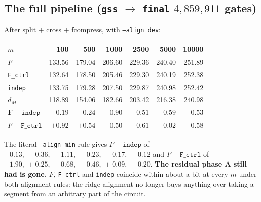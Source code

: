 \documentclass[11pt]{article}
\newcommand{\code}[1]{\texttt{#1}}
\begin{document}
\subsection{The full pipeline (\code{gss} $\to$ \code{final} $4{,}859{,}911$ gates)}
After split $+$ cross $+$ fcompress, with \code{--align dev}:
\begin{center}\small
\begin{tabular}{@{}lrrrrrr@{}}
\toprule
$m$ & 100 & 500 & 1000 & 2500 & 5000 & 10000 \\
\midrule
$F$ & 133.56 & 179.04 & 206.60 & 229.36 & 240.40 & 251.89 \\
\code{F\_ctrl} & 132.64 & 178.50 & 205.46 & 229.30 & 240.19 & 252.38 \\
\code{indep} & 133.75 & 179.28 & 207.50 & 229.87 & 240.98 & 252.42 \\
$d_M$ & 118.89 & 154.06 & 182.66 & 203.42 & 216.38 & 240.98 \\
\midrule
$\mathbf{F-\code{indep}}$ & $\mathbf{-0.19}$ & $\mathbf{-0.24}$ & $\mathbf{-0.90}$ & $\mathbf{-0.51}$ & $\mathbf{-0.59}$ & $\mathbf{-0.53}$ \\
$F-\code{F\_ctrl}$ & $+0.92$ & $+0.54$ & $-0.50$ & $-0.61$ & $-0.02$ & $-0.58$ \\
\bottomrule
\end{tabular}
\end{center}
The literal \code{--align min} rule gives $F-\code{indep}$ of $+0.13,\,-0.36,\,-1.11,\,-0.23,\,-0.17,\,
-0.12$ and $F-\code{F\_ctrl}$ of $+1.90,\,+0.25,\,-0.68,\,-0.46,\,+0.09,\,-0.20$.
\textbf{The residual phase A still had is gone.} $F$, \code{F\_ctrl} and \code{indep} coincide within
about a bit at every $m$ under both alignment rules: the ridge alignment no longer buys anything over
taking a segment from an arbitrary part of the circuit.
\end{document}
